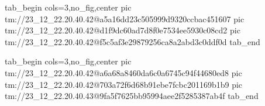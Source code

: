  
 
 
 
 

\qqSecCmtScr


\ifcmt
  tab_begin cols=3,no_fig,center
    pic tm://23_12_22.20.40.42@a5a16dd23c505999d9320ccbac451607
    pic tm://23_12_22.20.40.42@d1f9dc60ad7d8f0e7534ee5930c08cd2
    pic tm://23_12_22.20.40.42@f5c5af3e29879256ca8a2abd3c0ddf0d
  tab_end
\fi


\ifcmt
  tab_begin cols=3,no_fig,center
    pic tm://23_12_22.20.40.42@a6a68a8460da6c0a6745c94f44680ed8
    pic tm://23_12_22.20.40.42@703a72f6d68b91ebe7fcbc201169b1b9
    pic tm://23_12_22.20.40.43@9fa5f7625bb95994aee2f5285387ab4f
  tab_end
\fi

